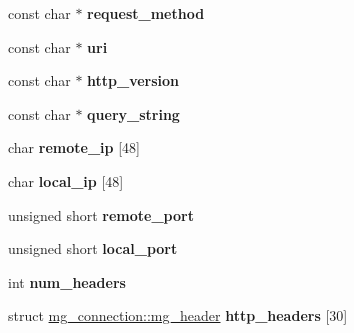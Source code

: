 \begin{DoxyCompactItemize}
\item 
\hypertarget{structmg__connection_a7a2b15778b91c5f4654271bc941e5e6f}{const char $\ast$ {\bfseries request\-\_\-method}}\label{structmg__connection_a7a2b15778b91c5f4654271bc941e5e6f}

\item 
\hypertarget{structmg__connection_a65b85efe4e7c90b57a9b7452c5bb7730}{const char $\ast$ {\bfseries uri}}\label{structmg__connection_a65b85efe4e7c90b57a9b7452c5bb7730}

\item 
\hypertarget{structmg__connection_aa2cad585b774df954a8da43b404db695}{const char $\ast$ {\bfseries http\-\_\-version}}\label{structmg__connection_aa2cad585b774df954a8da43b404db695}

\item 
\hypertarget{structmg__connection_a945360c8666acb1546867b9043fb6f61}{const char $\ast$ {\bfseries query\-\_\-string}}\label{structmg__connection_a945360c8666acb1546867b9043fb6f61}

\item 
\hypertarget{structmg__connection_aed0bf0830e52410e0ea6e404aaf19892}{char {\bfseries remote\-\_\-ip} \mbox{[}48\mbox{]}}\label{structmg__connection_aed0bf0830e52410e0ea6e404aaf19892}

\item 
\hypertarget{structmg__connection_a95a74b7afd4c2b1edee0dfa81ef9870b}{char {\bfseries local\-\_\-ip} \mbox{[}48\mbox{]}}\label{structmg__connection_a95a74b7afd4c2b1edee0dfa81ef9870b}

\item 
\hypertarget{structmg__connection_a4420563d43b4f800438585b8b32204e1}{unsigned short {\bfseries remote\-\_\-port}}\label{structmg__connection_a4420563d43b4f800438585b8b32204e1}

\item 
\hypertarget{structmg__connection_a979cee1562ca5e92e561ef82f3842f87}{unsigned short {\bfseries local\-\_\-port}}\label{structmg__connection_a979cee1562ca5e92e561ef82f3842f87}

\item 
\hypertarget{structmg__connection_a48af0c95935d50e2a33fc5dd2c275643}{int {\bfseries num\-\_\-headers}}\label{structmg__connection_a48af0c95935d50e2a33fc5dd2c275643}

\item 
\hypertarget{structmg__connection_a63386f3005373a7b41fe857a8535cf51}{struct \hyperlink{structmg__connection_1_1mg__header}{mg\-\_\-connection\-::mg\-\_\-header} {\bfseries http\-\_\-headers} \mbox{[}30\mbox{]}}\label{structmg__connection_a63386f3005373a7b41fe857a8535cf51}


\end{DoxyCompactItemize}
